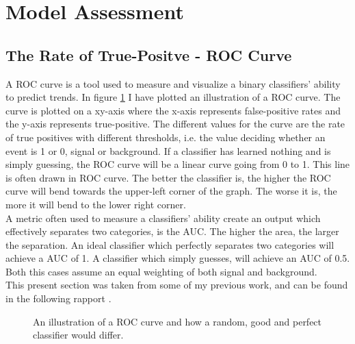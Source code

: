 \section{Model Assessment}\label{subsec:Cost}
\subsection{The Rate of True-Positve - ROC Curve}\label{subsec:AUC}
A \ac{ROC} curve is a tool used to measure and visualize a binary classifiers' ability 
to predict trends. In figure \ref{fig:ROC} I have plotted an illustration of a \ac{ROC} curve.
The curve is plotted on a xy-axis where the x-axis represents 
false-positive rates and the y-axis represents true-positive. The different values 
for the curve are the rate of true positives with different thresholds, i.e. 
the value deciding whether an event is 1 or 0, signal or background. If a classifier 
has learned nothing and is simply guessing, the \ac{ROC} curve will be a linear curve 
going from 0 to 1. This line is often drawn in \ac{ROC} curve. The better the 
classifier is, the higher the \ac{ROC} curve will bend towards the upper-left corner of the 
graph. The worse it is, the more it will bend to the lower right corner. 
\\
A metric often used to measure a classifiers' ability create an output which effectively 
separates two categories, is the \ac{AUC}. The higher the area, the larger the separation. 
An ideal classifier which perfectly separates two categories will achieve a \ac{AUC} of 1.
A classifier which simply guesses, will achieve an \ac{AUC} of 0.5. Both this cases assume 
an equal weighting of both signal and background. 
\\
This present section was taken from some of my previous work, and can be found in the following 
rapport \cite{HirstFretteML}.
\begin{figure}
    \centering
    \caption{An illustration of a \acs{ROC} curve and how a random, good and perfect classifier would differ.}
    \label{fig:ROC}
\end{figure}
